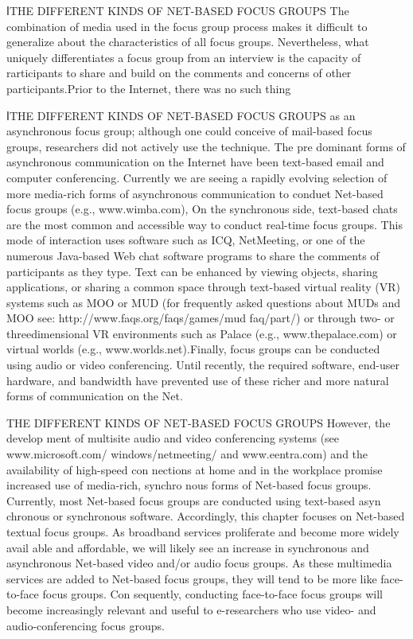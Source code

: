 \documentclass{beamer}
\begin{document}
\begin{frame}{اTHE DIFFERENT KINDS OF NET-BASED FOCUS GROUPS}
The combination of media used in the focus group process makes it
difficult to generalize about the characteristics of all focus groups. Nevertheless,
what uniquely differentiates a focus group from an interview is
the capacity of rarticipants to share and build on the comments and concerns
of other participants.Prior to the Internet, there was no such thing
\end{frame}	
\begin{frame}{اTHE DIFFERENT KINDS OF NET-BASED FOCUS GROUPS}
as an asynchronous focus group; although one could conceive of mail-based
focus groups, researchers did not actively use the technique. The pre dominant
forms of asynchronous communication on the Internet have been
text-based email and computer conferencing. Currently we are seeing a
rapidly evolving selection of more media-rich forms of asynchronous communication
to conduet Net-based focus groups (e.g., www.wimba.com), On
the synchronous side, text-based chats are the most common and accessible
way to conduct real-time focus groups. This mode of interaction uses
software such as ICQ, NetMeeting, or one of the numerous Java-based Web
chat software programs to share the comments of participants as they type.
Text can be enhanced by viewing objects, sharing applications, or sharing
a common space through text-based virtual reality (VR) systems such as
MOO or MUD (for frequently asked questions about MUDs and MOO see:
http://www.faqs.org/faqs/games/mud faq/part/) or through two- or threedimensional
VR environments such as Palace (e.g., www.thepalace.com)
or virtual worlds (e.g., www.worlds.net).Finally, focus groups can be conducted
using audio or video conferencing. Until recently, the required software,
end-user hardware, and bandwidth have prevented use of these richer
and more natural forms of communication on the Net.
\end{frame}


\begin{frame}{THE DIFFERENT KINDS OF NET-BASED FOCUS GROUPS}
However, the develop ment of multisite audio and video conferencing systems
(see www.microsoft.com/ windows/netmeeting/ and www.eentra.com)
and the availability of high-speed con nections at home and in the workplace
promise increased use of media-rich, synchro nous forms of Net-based
focus groups. Currently, most Net-based focus groups are conducted using
text-based asyn chronous or synchronous software. Accordingly, this
chapter focuses on Net-based textual focus groups. As broadband services
proliferate and become more widely avail able and affordable, we will likely
see an increase in synchronous and asynchronous Net-based video and/or
audio focus groups. As these multimedia services are added to Net-based
focus groups, they will tend to be more like face-to-face focus groups. Con
sequently, conducting face-to-face focus groups will become increasingly
relevant and useful to e-researchers who use video- and audio-conferencing
focus groups.
\end{frame}
\end{document}

